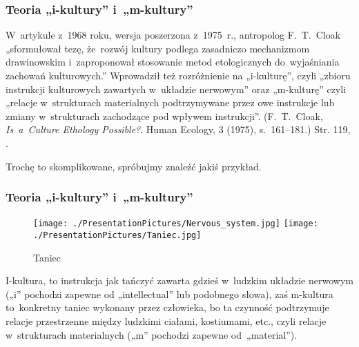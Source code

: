 \documentclass[10pt,t]{beamer}
\begin{document}
\begin{frame}
  \frametitle{Teoria „i-kultury” i~„m-kultury”}


  W~artykule z~1968 roku, wersja poszerzona z~1975~r., antropolog
  F.~T.~Cloak „sformułował tezę, że~rozwój kultury podlega
  zasadniczo mechanizmom drawinowskim i~zaproponował stosowanie
  metod etologicznych do~wyjaśniania zachowań kulturowych.”
  Wprowadził też rozróżnienie na „i-kulturę”, czyli „zbioru
  instrukcji kulturowych zawartych w~układzie nerwowym” oraz
  „m-kulturę” czyli „relacje w~strukturach materialnych
  podtrzymywane przez owe instrukcje lub zmiany w~strukturach
  zachodzące pod wpływem instrukcji”. (F.~T.~Cloak,
  \textit{Is~a~Culture Ethology Possible?}. Human Ecology, 3
    (1975), s.~161--181.) Str. 119, \cite{McGrathBogDawkinsa2008}.

  Trochę to skomplikowane, spróbujmy znaleźć jakiś przykład.

\end{frame}





\begin{frame}
  \frametitle{Teoria „i-kultury” i~„m-kultury”}


  \begin{figure}

    \centering

    \texttt{[image: ./PresentationPictures/Nervous\_system.jpg]}
    \texttt{[image: ./PresentationPictures/Taniec.jpg]}


    \caption{Taniec}

  \end{figure}


  I-kultura, to instrukcja jak tańczyć zawarta gdzieś
  w~ludzkim układzie nerwowym („i” pochodzi zapewne od
  „intellectual” lub podobnego słowa), zaś m-kultura
  to~konkretny taniec wykonany przez człowieka, bo ta czynność
  podtrzymuje relacje przestrzenne między ludzkimi ciałami,
  kostiumami, etc., czyli relacje w~strukturach materialnych („m”
  pochodzi zapewne od~„material”).

\end{frame}
\end{document}
